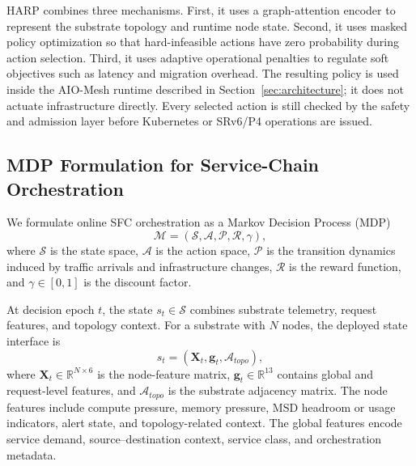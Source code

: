 \documentclass[final,5p]{elsarticle}
\begin{document}
HARP combines three mechanisms. First, it uses a graph-attention encoder to represent the substrate topology and runtime node state. Second, it uses masked policy optimization so that hard-infeasible actions have zero probability during action selection. Third, it uses adaptive operational penalties to regulate soft objectives such as latency and migration overhead. The resulting policy is used inside the AIO-Mesh runtime described in Section~\ref{sec:architecture}; it does not actuate infrastructure directly. Every selected action is still checked by the safety and admission layer before Kubernetes or SRv6/P4 operations are issued.

\subsection{MDP Formulation for Service-Chain Orchestration}
\label{subsec:harp_mdp}

We formulate online SFC orchestration as a Markov Decision Process (MDP)
\begin{equation}
    \mathcal{M} = \left(\mathcal{S}, \mathcal{A}, \mathcal{P}, \mathcal{R}, \gamma\right),
\end{equation}
where \(\mathcal{S}\) is the state space, \(\mathcal{A}\) is the action space, \(\mathcal{P}\) is the transition dynamics induced by traffic arrivals and infrastructure changes, \(\mathcal{R}\) is the reward function, and \(\gamma \in [0,1]\) is the discount factor.

At decision epoch \(t\), the state \(s_t \in \mathcal{S}\) combines substrate telemetry, request features, and topology context. For a substrate with \(N\) nodes, the deployed state interface is
\begin{equation}
    s_t = \left(\mathbf{X}_t, \mathbf{g}_t, \mathcal{A}_{topo}\right),
\end{equation}
where \(\mathbf{X}_t \in \mathbb{R}^{N \times 6}\) is the node-feature matrix, \(\mathbf{g}_t \in \mathbb{R}^{13}\) contains global and request-level features, and \(\mathcal{A}_{topo}\) is the substrate adjacency matrix. The node features include compute pressure, memory pressure, MSD headroom or usage indicators, alert state, and topology-related context. The global features encode service demand, source--destination context, service class, and orchestration metadata.
\end{document}
